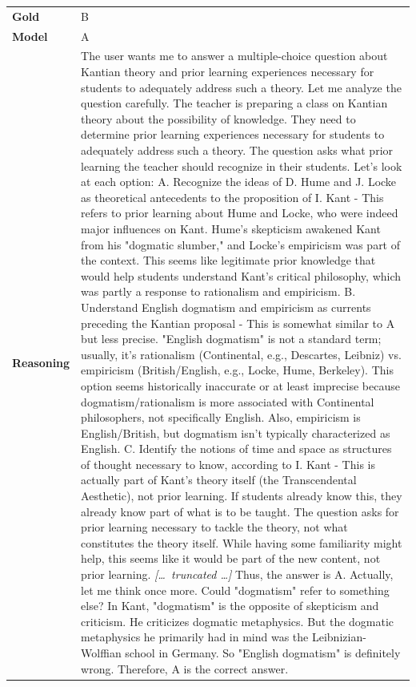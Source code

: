 \begin{longtable}{@{}l p{13cm}@{}}
  \textbf{Gold}      & B       \\
  \textbf{Model}     & A  \\
  \textbf{Reasoning} & The user wants me to answer a multiple-choice question about Kantian theory and prior learning experiences necessary for students to adequately address such a theory. \newline Let me analyze the question carefully. The teacher is preparing a class on Kantian theory about the possibility of knowledge. They need to determine prior learning experiences necessary for students to adequately address such a theory. The question asks what prior learning the teacher should recognize in their students. \newline Let's look at each option: \newline A. Recognize the ideas of D. Hume and J. Locke as theoretical antecedents to the proposition of I. Kant \newline - This refers to prior learning about Hume and Locke, who were indeed major influences on Kant. Hume's skepticism awakened Kant from his "dogmatic slumber," and Locke's empiricism was part of the context. This seems like legitimate prior knowledge that would help students understand Kant's critical philosophy, which was partly a response to rationalism and empiricism. \newline B. Understand English dogmatism and empiricism as currents preceding the Kantian proposal \newline - This is somewhat similar to A but less precise. "English dogmatism" is not a standard term; usually, it's rationalism (Continental, e.g., Descartes, Leibniz) vs. empiricism (British/English, e.g., Locke, Hume, Berkeley). This option seems historically inaccurate or at least imprecise because dogmatism/rationalism is more associated with Continental philosophers, not specifically English. Also, empiricism is English/British, but dogmatism isn't typically characterized as English. \newline C. Identify the notions of time and space as structures of thought necessary to know, according to I. Kant \newline - This is actually part of Kant's theory itself (the Transcendental Aesthetic), not prior learning. If students already know this, they already know part of what is to be taught. The question asks for prior learning necessary to tackle the theory, not what constitutes the theory itself. While having some familiarity might help, this seems like it would be part of the new content, not prior learning. \newline \textit{[\ldots\ truncated \ldots]} \newline Thus, the answer is A. \newline Actually, let me think once more. Could "dogmatism" refer to something else? In Kant, "dogmatism" is the opposite of skepticism and criticism. He criticizes dogmatic metaphysics. But the dogmatic metaphysics he primarily had in mind was the Leibnizian-Wolffian school in Germany. So "English dogmatism" is definitely wrong. \newline Therefore, A is the correct answer.  \\

\end{longtable}
